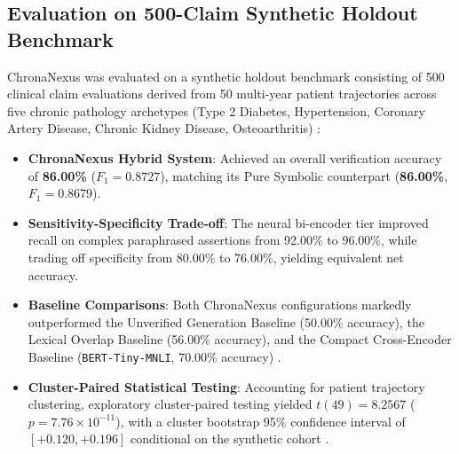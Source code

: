 \subsection{Evaluation on 500-Claim Synthetic Holdout Benchmark}
ChronaNexus was evaluated on a synthetic holdout benchmark consisting of 500 clinical claim evaluations derived from 50 multi-year patient trajectories across five chronic pathology archetypes (Type 2 Diabetes, Hypertension, Coronary Artery Disease, Chronic Kidney Disease, Osteoarthritis) \cite{pampari2018emrqa,umapathi2023medhalt,jin2019pubmedqa}:
\begin{itemize}
  \item \textbf{ChronaNexus Hybrid System}: Achieved an overall verification accuracy of \textbf{86.00\%} ($F_1 = 0.8727$), matching its Pure Symbolic counterpart (\textbf{86.00\%}, $F_1 = 0.8679$).
  \item \textbf{Sensitivity-Specificity Trade-off}: The neural bi-encoder tier improved recall on complex paraphrased assertions from 92.00\% to 96.00\%, while trading off specificity from 80.00\% to 76.00\%, yielding equivalent net accuracy.
  \item \textbf{Baseline Comparisons}: Both ChronaNexus configurations markedly outperformed the Unverified Generation Baseline (50.00\% accuracy), the Lexical Overlap Baseline (56.00\% accuracy), and the Compact Cross-Encoder Baseline (\texttt{BERT-Tiny-MNLI}, 70.00\% accuracy) \cite{bhargava2019berttiny}.
  \item \textbf{Cluster-Paired Statistical Testing}: Accounting for patient trajectory clustering, exploratory cluster-paired testing yielded $t(49) = 8.2567$ ($p = 7.76 \times 10^{-11}$), with a cluster bootstrap 95\% confidence interval of $[+0.120, +0.196]$ conditional on the synthetic cohort \cite{donner1992cluster,hoenig2001abuse,benjamini1995fdr}.
\end{itemize}

